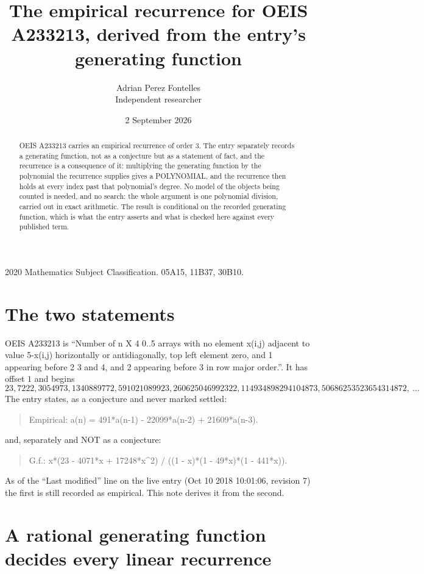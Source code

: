 \documentclass[11pt,a4paper]{article}
\title{The empirical recurrence for OEIS A233213, derived from the entry's generating function}
\author{Adrian Perez Fontelles\\ \small Independent researcher}
\date{2 September 2026}
\theoremstyle{plain}
\theoremstyle{definition}
\begin{document}
\maketitle

\begin{abstract}
OEIS A233213 carries an empirical recurrence of order $3$. The entry separately records a
generating function, not as a conjecture but as a statement of fact, and the recurrence is a
consequence of it: multiplying the generating function by the polynomial the recurrence
supplies gives a POLYNOMIAL, and the recurrence then holds at every index past that
polynomial's degree. No model of the objects being counted is needed, and no search: the
whole argument is one polynomial division, carried out in exact arithmetic. The result is
conditional on the recorded generating function, which is what the entry asserts and what is
checked here against every published term.
\end{abstract}

\noindent\small 2020 Mathematics Subject Classification. 05A15, 11B37, 30B10.\normalsize

\section{The two statements}

OEIS A233213 is ``Number of n X 4 0..5 arrays with no element x(i,j) adjacent to value 5-x(i,j) horizontally or antidiagonally, top left element zero, and 1 appearing before 2 3 and 4, and 2 appearing before 3 in row major order.''. It has offset $1$ and begins
\[
23, 7222, 3054973, 1340889772, 591021089923, 260625046992322, 114934898294104873, 50686253523654314872,\ \dots
\]
The entry states, as a conjecture and never marked settled:
\begin{quote}
Empirical: a(n) = 491*a(n-1) - 22099*a(n-2) + 21609*a(n-3).
\end{quote}
and, separately and NOT as a conjecture:
\begin{quote}
G.f.: x*(23 - 4071*x + 17248*x\^{}2) / ((1 - x)*(1 - 49*x)*(1 - 441*x)).
\end{quote}
As of the ``Last modified'' line on the live entry (Oct 10 2018 10:01:06, revision 7) the first is still
recorded as empirical. This note derives it from the second.

\section{A rational generating function decides every linear recurrence}
\end{document}
